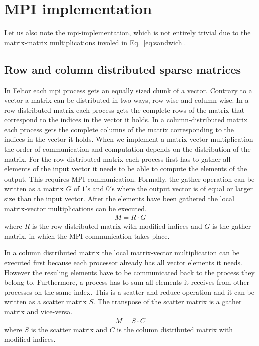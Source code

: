 \documentclass{hitec} %
\begin{document}
\section{MPI implementation}
Let us also note the mpi-implementation, which is not entirely
trivial due to the matrix-matrix multiplications involed in Eq.~\eqref{eq:sandwich}.
\subsection{Row and column distributed sparse matrices}
In Feltor each mpi process gets an equally sized chunk of a 
vector.
Contrary to a vector
a matrix can be distributed in two ways, row-wise and column wise. 
In a row-distributed matrix each process gets the complete 
rows of the matrix that correspond to the indices in the 
vector it holds. 
In a column-distributed matrix each process gets the complete 
columns of the matrix corresponding to the indices in the 
vector it holds. 
When we implement a matrix-vector multiplication the order 
of communication and computation depends on the distribution 
of the matrix.
For the row-distributed matrix each process first has to gather all elements of the input vector it needs to be able to compute the elements of the output. This requires MPI communication.
Formally, the gather operation can be written as a matrix $G$
of $1'$s and $0'$s where the output vector is of equal or larger size than the input vector.
After the elements have been gathered the local matrix-vector
multiplications can be executed.
\begin{align}
M = R\cdot G
\end{align}
where $R$ is the row-distributed matrix with modified indices 
and $G$ is the gather matrix, in which the MPI-communication takes place.

In a column distributed matrix the local matrix-vector multiplication can be executed first because each processor already
has all vector elements it needs. 
However the resuling elements have to be communicated back to 
the process they belong to. Furthermore, a process has to sum
all elements it receives from other processes on the same
index. This is a scatter and reduce operation and
it can be written as a scatter matrix $S$. The transpose
of the scatter matrix is a gather matrix and vice-versa.
\begin{align}
M = S\cdot C
\end{align}
where $S$ is the scatter matrix and $C$ is the column distributed
matrix with modified indices. 
\end{document}
